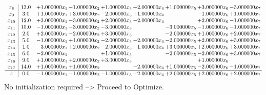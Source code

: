 \documentclass[10pt]{article}
\begin{document}
\[\begin{array}{c| c c@{\hskip 2pt} c@{\hskip 2pt} c@{\hskip 2pt} c@{\hskip 2pt} c@{\hskip 2pt} c@{\hskip 2pt} c@{\hskip 2pt} }
 x_{8}   &  13.0 & + 1.000000 x_{1} & -1.000000 x_{2} & + 1.000000 x_{3} & + 2.000000 x_{4} & + 1.000000 x_{5} & + 3.000000 x_{6} & -3.000000 x_{7}\\
 x_{9}   &  3.0 & + 1.000000 x_{1} & + 3.000000 x_{2} & -2.000000 x_{3} & + 1.000000 x_{4} &   & -1.000000 x_{6} & + 1.000000 x_{7}\\
 x_{10}   &  12.0 & + 3.000000 x_{1} & -3.000000 x_{2} & + 2.000000 x_{3} & -2.000000 x_{4} &   & + 2.000000 x_{6} & -1.000000 x_{7}\\
 x_{11}   &  15.0 & -1.000000 x_{1} & -3.000000 x_{2} & -3.000000 x_{3} &   & -3.000000 x_{5} & -1.000000 x_{6} & -1.000000 x_{7}\\
 x_{12}   &  2.0 & + 2.000000 x_{1} & -2.000000 x_{2} & + 3.000000 x_{3} &   & -2.000000 x_{5} & + 1.000000 x_{6} & + 2.000000 x_{7}\\
 x_{13}   &  5.0 & -1.000000 x_{1} & + 1.000000 x_{2} & -2.000000 x_{3} & -2.000000 x_{4} & -2.000000 x_{5} & + 2.000000 x_{6} & + 3.000000 x_{7}\\
 x_{14}   &  1.0 & -3.000000 x_{1} & + 2.000000 x_{2} & -2.000000 x_{3} & -1.000000 x_{4} & + 3.000000 x_{5} & + 2.000000 x_{6} & + 3.000000 x_{7}\\
 x_{15}   &  6.0 & -2.000000 x_{1} &   & + 1.000000 x_{3} &   & -2.000000 x_{5} & -2.000000 x_{6} & + 3.000000 x_{7}\\
 x_{16}   &  9.0 & + 1.000000 x_{1} & + 2.000000 x_{2} & + 3.000000 x_{3} &    &   & + 1.000000 x_{6} &   \\
 x_{17}   &  14.0 & + 1.000000 x_{1} & + 1.000000 x_{2} &   & -2.000000 x_{4} & + 1.000000 x_{5} & -2.000000 x_{6} & -1.000000 x_{7}\\
\hline
z    &  0.0 & -1.000000 x_{1} & -1.000000 x_{2} & -1.000000 x_{3} & -2.000000 x_{4} & + 2.000000 x_{5} & + 2.000000 x_{6} & + 2.000000 x_{7}\\
\end{array}\]
No initialization required --> Proceed to Optimize. 
\end{document}

